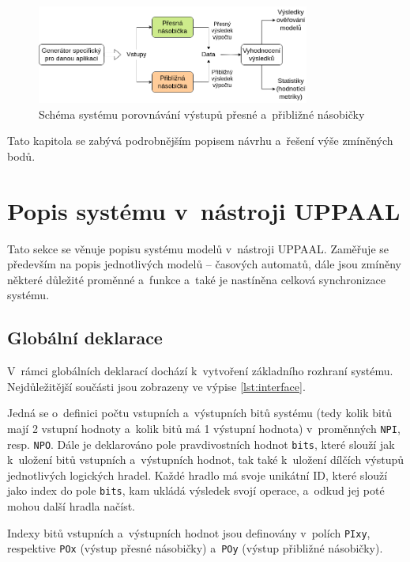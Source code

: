 \begin{figure}[H]
    \centering
    \includegraphics[width=0.8\textwidth]{obrazky-figures/acc_approx_diagram.png}
    \caption{Schéma systému porovnávání výstupů přesné a~přibližné násobičky}
    \label{fig:acc_approx_diagram}
\end{figure}

Tato kapitola se zabývá podrobnějším popisem návrhu a~řešení výše zmíněných bodů.

\section{Popis systému v~nástroji UPPAAL}
Tato sekce se věnuje popisu systému modelů v~nástroji UPPAAL. Zaměřuje se především na popis jednotlivých modelů -- časových automatů, dále jsou zmíněny některé důležité proměnné a~funkce a~také je nastíněna celková synchronizace systému.

\subsection{Globální deklarace}
V~rámci globálních deklarací dochází k~vytvoření základního rozhraní systému. Nejdůležitější součásti jsou zobrazeny ve výpise \ref{lst:interface}. 

Jedná se o~definici počtu vstupních a~výstupních bitů systému (tedy kolik bitů mají 2 vstupní hodnoty a~kolik bitů má 1 výstupní hodnota) v~proměnných \texttt{NPI}, resp. \texttt{NPO}. Dále je deklarováno pole pravdivostních hodnot \texttt{bits}, které slouží jak k~uložení bitů vstupních a~výstupních hodnot, tak také k~uložení dílčích výstupů jednotlivých logických hradel. Každé hradlo má svoje unikátní ID, které slouží jako index do pole \texttt{bits}, kam ukládá výsledek svojí operace, a~odkud jej poté mohou další hradla načíst.

Indexy bitů vstupních a~výstupních hodnot jsou definovány v~polích \texttt{PIxy}, respektive \texttt{POx} (výstup přesné násobičky) a~\texttt{POy} (výstup přibližné násobičky).

